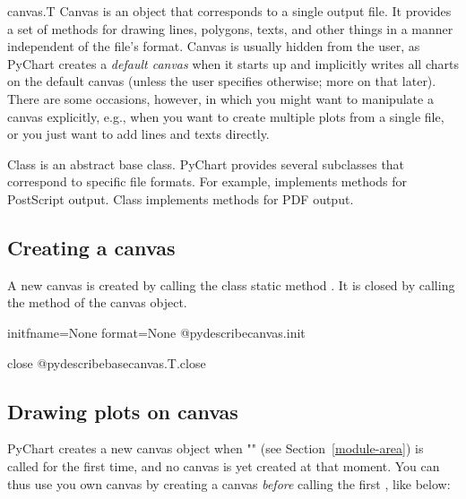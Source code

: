 \documentclass{howto}
\newcommand{\pychart}{PyChart}
\newcommand{\pxref}[1]{see Section~\ref{#1}}
\begin{document}
\begin{classdesc*}{canvas.T}
Canvas is an object that corresponds to a single output file. It
provides a set of methods for drawing lines, polygons, texts, and other
things in a manner independent of the file's format.  Canvas is usually
hidden from the user, as \pychart{} creates a \emph{default canvas} when it
starts up and implicitly writes all charts on the default canvas (unless
the user specifies otherwise; more on that later). There are some
occasions, however, in which you might want to manipulate a canvas
explicitly, e.g., when you want to create multiple plots from a single
file, or you just want to add lines and texts directly.

Class  is an abstract base class. \pychart{} provides several
subclasses that correspond to specific file formats. For example,
 implements methods for PostScript output. Class
 implements methods for PDF output.
\end{classdesc*}

\subsection{Creating a canvas}\label{creating-canvas}

A new canvas is created by calling the class static method
. It is closed by
calling the  method of the canvas object.

\begin{funcdesc}{init}{fname=None format=None}
@pydescribe{canvas.init}
\end{funcdesc}

\begin{methoddesc}{close}{}
@pydescribe{basecanvas.T.close}
\end{methoddesc}


\subsection{Drawing plots on canvas}\label{drawing-graph-canvas}
\pychart{} creates a new canvas object when ""
(\pxref{module-area}) is called for the first time, and no canvas is yet
created at that moment.  You can thus use you own canvas by creating a
canvas \emph{before} calling the first , like below:
\end{document}
